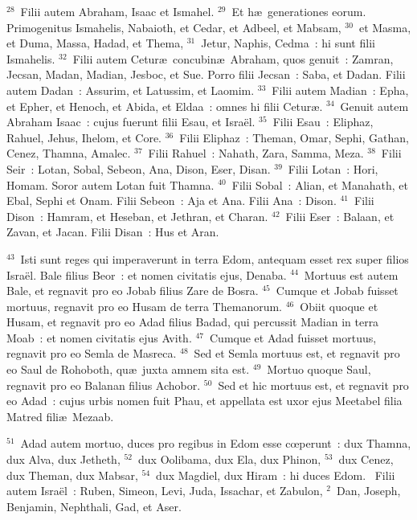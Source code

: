 ${}^{28}$~Filii autem Abraham, Isaac et Ismahel.
${}^{29}$~Et h\ae\ generationes eorum. Primogenitus Ismahelis, Nabaioth, et Cedar, et Adbeel, et Mabsam,
${}^{30}$~et Masma, et Duma, Massa, Hadad, et Thema,
${}^{31}$~Jetur, Naphis, Cedma~: hi sunt filii Ismahelis.
${}^{32}$~Filii autem Cetur\ae\ concubin\ae\ Abraham, quos genuit~: Zamran, Jecsan, Madan, Madian, Jesboc, et Sue. Porro filii Jecsan~: Saba, et Dadan. Filii autem Dadan~: Assurim, et Latussim, et Laomim.
${}^{33}$~Filii autem Madian~: Epha, et Epher, et Henoch, et Abida, et Eldaa~: omnes hi filii Cetur\ae .
${}^{34}$~Genuit autem Abraham Isaac~: cujus fuerunt filii Esau, et Isra\"el.
${}^{35}$~Filii Esau~: Eliphaz, Rahuel, Jehus, Ihelom, et Core.
${}^{36}$~Filii Eliphaz~: Theman, Omar, Sephi, Gathan, Cenez, Thamna, Amalec.
${}^{37}$~Filii Rahuel~: Nahath, Zara, Samma, Meza.
${}^{38}$~Filii Seir~: Lotan, Sobal, Sebeon, Ana, Dison, Eser, Disan.
${}^{39}$~Filii Lotan~: Hori, Homam. Soror autem Lotan fuit Thamna.
${}^{40}$~Filii Sobal~: Alian, et Manahath, et Ebal, Sephi et Onam. Filii Sebeon~: Aja et Ana. Filii Ana~: Dison.
${}^{41}$~Filii Dison~: Hamram, et Heseban, et Jethran, et Charan.
${}^{42}$~Filii Eser~: Balaan, et Zavan, et Jacan. Filii Disan~: Hus et Aran.


${}^{43}$~Isti sunt reges qui imperaverunt in terra Edom, antequam esset rex super filios Isra\"el. Bale filius Beor~: et nomen civitatis ejus, Denaba.
${}^{44}$~Mortuus est autem Bale, et regnavit pro eo Jobab filius Zare de Bosra.
${}^{45}$~Cumque et Jobab fuisset mortuus, regnavit pro eo Husam de terra Themanorum.
${}^{46}$~Obiit quoque et Husam, et regnavit pro eo Adad filius Badad, qui percussit Madian in terra Moab~: et nomen civitatis ejus Avith.
${}^{47}$~Cumque et Adad fuisset mortuus, regnavit pro eo Semla de Masreca.
${}^{48}$~Sed et Semla mortuus est, et regnavit pro eo Saul de Rohoboth, qu\ae\ juxta amnem sita est.
${}^{49}$~Mortuo quoque Saul, regnavit pro eo Balanan filius Achobor.
${}^{50}$~Sed et hic mortuus est, et regnavit pro eo Adad~: cujus urbis nomen fuit Phau, et appellata est uxor ejus Meetabel filia Matred fili\ae\ Mezaab.


${}^{51}$~Adad autem mortuo, duces pro regibus in Edom esse cœperunt~: dux Thamna, dux Alva, dux Jetheth,
${}^{52}$~dux Oolibama, dux Ela, dux Phinon,
${}^{53}$~dux Cenez, dux Theman, dux Mabsar,
${}^{54}$~dux Magdiel, dux Hiram~: hi duces Edom.
~\lettrine[lines=10,image=true,loversize=0.05,lraise=-0.03]{F}{}ilii autem Isra\"el~: Ruben, Simeon, Levi, Juda, Issachar, et Zabulon,
${}^{2}$~Dan, Joseph, Benjamin, Nephthali, Gad, et Aser.


